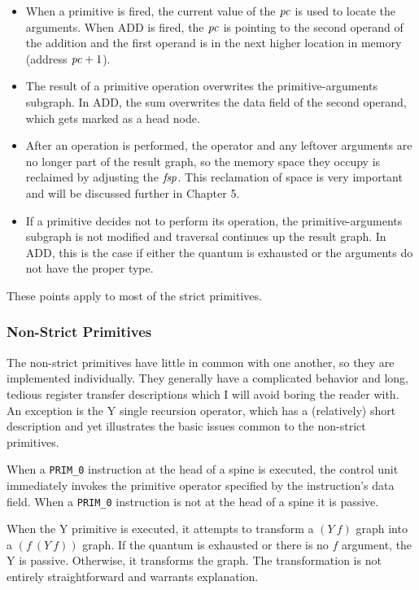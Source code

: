 \begin{itemize}
\item When a primitive is fired, the current value of the \(\mathit{pc}\) is used to locate the
arguments. When ADD is fired, the \(\mathit{pc}\) is pointing to the second operand of the addition
and the first operand is in the next higher location in memory (address \(\mathit{pc}+1\)).

\item The result of a primitive operation overwrites the primitive-arguments subgraph. In
ADD, the sum overwrites the data field of the second operand, which gets marked as a head
node.

\item After an operation is performed, the operator and any leftover arguments are no
longer part of the result graph, so the memory space they occupy is reclaimed by adjusting
the \(\mathit{fsp}\). This reclamation of space is very important and will be discussed further in
Chapter 5.

\item If a primitive decides not to perform its operation, the primitive-arguments subgraph
is not modified and traversal continues up the result graph. In ADD, this is the case if
either the quantum is exhausted or the arguments do not have the proper type.
\end{itemize}

These points apply to most of the strict primitives.

\subsubsection*{Non-Strict Primitives}

The non-strict primitives have little in common with one another, so they are implemented
individually. They generally have a complicated behavior and long, tedious register
transfer descriptions which I will avoid boring the reader with. An exception is the Y
single recursion operator, which has a (relatively) short description and yet illustrates
the basic issues common to the non-strict primitives.

When a \texttt{PRIM\_0} instruction at the head of a spine is executed, the control unit
immediately invokes the primitive operator specified by the instruction's data field. When
a \texttt{PRIM\_0} instruction is not at the head of a spine it is passive.

When the Y primitive is executed, it attempts to transform a \((Y\ f)\) graph into a
\((f\ (Y\ f))\) graph. If the quantum is exhausted or there is no \(f\) argument, the Y is
passive. Otherwise, it transforms the graph. The transformation is not entirely
straightforward and warrants explanation.

